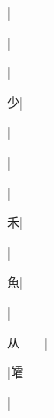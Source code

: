 \begin{multicols}{2}
{{\cjk{}{\cnsym{}　}{\cnsym{}　}{\cnsym{}　}}|{}\par
{\cjk{}{\cnsym{}　}{\cnsym{}　}{\cnsym{}　}}|{}\par
{\cjk{}{\cnsym{}　}{\cnsym{}　}{\cnsym{}　}}|{}\par
{\cjk{}{\cnsym{}　}{\cnsym{}　}少}|{}\par
{\cjk{}{\cnsym{}　}{\cnsym{}　}{\cnsym{}　}}|{}\par
{\cjk{}{\cnsym{}　}{\cnsym{}　}{\cnsym{}　}}|{}\par
{}|{}\par
{\cjk{}{\cnsym{}　}{\cnsym{}　}禾}|{}\par
{\cjk{}{\cnsym{}　}{\cnsym{}　}{\cnsym{}　}}|{}\par
{\cjk{}{\cnsym{}　}{\cnsym{}　}魚}|{}\par
{\cjk{}{\cnsym{}　}{\cnsym{}　}{\cnsym{}　}}|{}\par
{\cjk{}从{\cnsym{}　}{\cnsym{}　}}|{}\par
{\cjk{}{\cnsym{}　}{\cnsym{}　}{\cnsym{}　}}|{\cjk{}皬}\par
{\cjk{}{\cnsym{}　}{\cnsym{}　}{\cnsym{}　}}|{}\par
}
\end{multicols}
